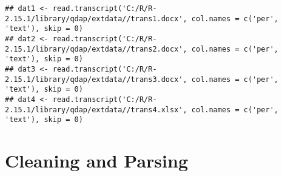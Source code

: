 \documentclass[a4paper]{article}\usepackage{graphicx, color}
\makeatletter
\newenvironment{kframe}{%
 \def\at@end@of@kframe{}%
 \ifinner\ifhmode%
  \def\at@end@of@kframe{\end{minipage}}%
  \begin{minipage}{\columnwidth}%
 \fi\fi%
 \def\FrameCommand##1{\hskip\@totalleftmargin \hskip-\fboxsep
 \colorbox{shadecolor}{##1}\hskip-\fboxsep
     \hskip-\linewidth \hskip-\@totalleftmargin \hskip\columnwidth}%
 \MakeFramed {\advance\hsize-\width
   \@totalleftmargin\z@ \linewidth\hsize
   \@setminipage}}%
 {\par\unskip\endMakeFramed%
 \at@end@of@kframe}
\newenvironment{knitrout}{}{} %
\makeatother
\begin{document}
\begin{knitrout}
\color{fgcolor}\begin{kframe}
\begin{lstlisting}[basicstyle=\ttfamily,breaklines=true]
## dat1 <- read.transcript('C:/R/R-2.15.1/library/qdap/extdata//trans1.docx', col.names = c('per', 'text'), skip = 0)
## dat2 <- read.transcript('C:/R/R-2.15.1/library/qdap/extdata//trans2.docx', col.names = c('per', 'text'), skip = 0)
## dat3 <- read.transcript('C:/R/R-2.15.1/library/qdap/extdata//trans3.docx', col.names = c('per', 'text'), skip = 0)
## dat4 <- read.transcript('C:/R/R-2.15.1/library/qdap/extdata//trans4.xlsx', col.names = c('per', 'text'), skip = 0)
\end{lstlisting}
\end{kframe}
\end{knitrout}



\section*{Cleaning and Parsing}



\end{document}
